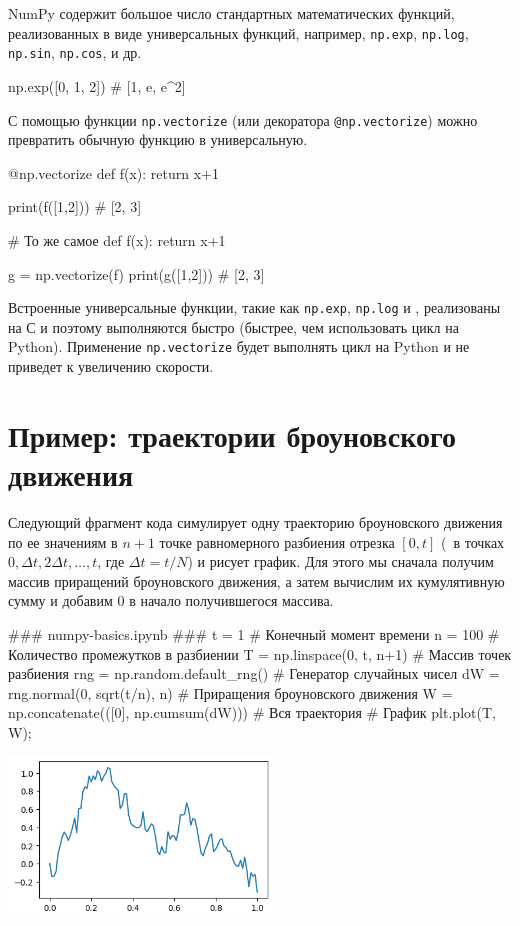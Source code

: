 NumPy содержит большое число стандартных математических функций, реализованных в виде универсальных функций, например, \verb"np.exp", \verb"np.log", \verb"np.sin", \verb"np.cos", и др.
\begin{python}
np.exp([0, 1, 2])       # [1, e, e^2]
\end{python}

С помощью функции \verb"np.vectorize" (или декоратора \verb"@np.vectorize") можно превратить обычную функцию в универсальную.
\begin{python}
@np.vectorize
def f(x):
    return x+1

print(f([1,2]))     # [2, 3]

# То же самое
def f(x):
    return x+1

g = np.vectorize(f)
print(g([1,2]))     # [2, 3]
\end{python}

\begin{remark}
Встроенные универсальные функции, такие как \verb"np.exp", \verb"np.log" и \td, реализованы на С и поэтому выполняются быстро (быстрее, чем использовать цикл на Python).
Применение \verb"np.vectorize" будет выполнять цикл на Python и не приведет к увеличению скорости.
\end{remark}


\section{Пример: траектории броуновского движения}
Следующий фрагмент кода симулирует одну траекторию броуновского движения по ее значениям в $n+1$ точке равномерного разбиения отрезка $[0, t]$ (\te\ в точках $0, \Delta t, 2\Delta t,\ldots, t$, где $\Delta t = t/N$) и рисует график.
Для этого мы сначала получим массив приращений броуновского движения, а затем вычислим их кумулятивную сумму и добавим 0 в начало получившегося массива.

\begin{python}
### numpy-basics.ipynb ###
t = 1                                # Конечный момент времени
n = 100                              # Количество промежутков в разбиении
T = np.linspace(0, t, n+1)           # Массив точек разбиения
rng = np.random.default_rng()        # Генератор случайных чисел
dW = rng.normal(0, sqrt(t/n), n)     # Приращения броуновского движения
W = np.concatenate(([0], np.cumsum(dW)))  # Вся траектория
# График
plt.plot(T, W);
\end{python}

\noindent
\includegraphics[width=7cm]{pic/bm-path.png}

